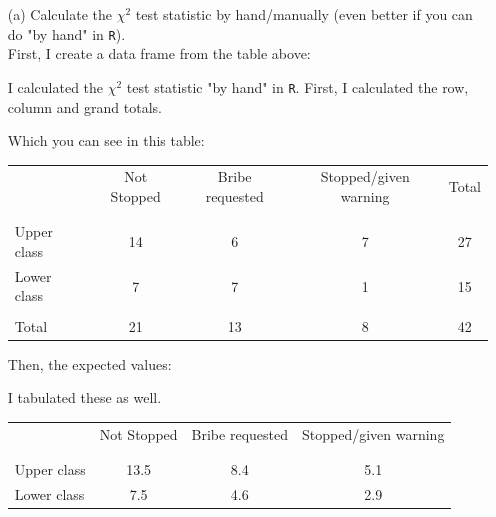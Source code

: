 \documentclass[12pt,letterpaper]{article}
\begin{document}
\begin{enumerate}
	
	\item [(a)]
	Calculate the $\chi^2$ test statistic by hand/manually (even better if you can do "by hand" in \texttt{R}).\\
	
	First, I create a data frame from the table above: 

	
	  
	I calculated the $\chi^2$ test statistic "by hand" in \texttt{R}.
	First, I calculated the row, column and grand totals.
	
	  
	
	Which you can see in this table: 
	
	\begin{table}[h!]
		\centering
		\begin{tabular}{l | c c c | c }
			& Not Stopped & Bribe requested & Stopped/given warning & Total \\
			\\[-1.8ex] 
			\hline \\[-1.8ex]
			Upper class & 14 & 6 & 7 & 27 \\
			Lower class & 7 & 7 & 1 & 15 \\
			\hline
			\\[-1.8ex]
			Total & 21 & 13 & 8 & 42 \\
		\end{tabular}
	\end{table}
	
	Then, the expected values:
	
		  
	
	I tabulated these as well.
	
	\begin{table}
		\centering
		\begin{tabular}{l | c c c }
			& Not Stopped & Bribe requested & Stopped/given warning \\
			\\[-1.8ex] 
			\hline \\[-1.8ex]
			Upper class & 13.5 & 8.4 & 5.1 \\
			Lower class & 7.5 & 4.6 & 2.9 \\
			\hline
		\end{tabular}
	\end{table}
	

\end{enumerate}
\end{document}
